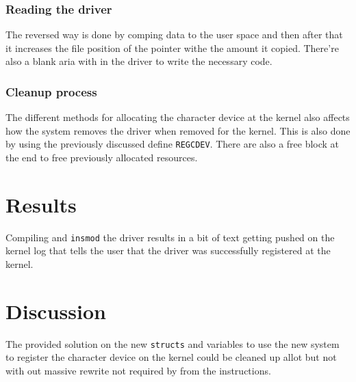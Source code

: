 \subsubsection{Reading the driver}%
\label{ssub:method:read}
The reversed way is done by comping data to the user space and then after that it increases the file position of the pointer withe the amount it copied. There're also a blank aria with in the driver to write the necessary code.


\subsubsection{Cleanup process}%
\label{ssub:method:cleanup}
The different methods for allocating the character device at the kernel also affects how the system removes the driver when removed for the kernel. This is also done by using the previously discussed define \verb|REGCDEV|. There are also a free block at the end to free previously allocated resources.



\section{Results}%
\label{sec:results}
Compiling and \verb|insmod| the driver results in a bit of text getting pushed on the kernel log that tells the user that the driver was successfully registered at the kernel.


\section{Discussion}%
\label{sec:Discussion}
The provided solution on the new \verb|structs| and variables to use the new system to register the character device on the kernel could be cleaned up allot but not with out massive rewrite not required by from the instructions.




